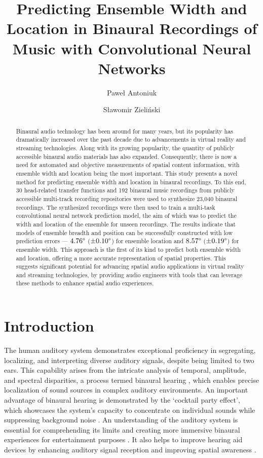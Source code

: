 \documentclass{article}
\title{Predicting Ensemble Width and Location in Binaural Recordings of Music with Convolutional Neural Networks}
\author[1,*]{Paweł Antoniuk}
\author[1]{Sławomir Zieliński}
\affil[1]{Faculty of Computer Science, Białystok University of Technology}
\affil[*]{Corresponding author: pawel.antoniuk@sd.pb.edu.pl}
\date{}
\begin{document}
\maketitle

\begin{abstract}
  Binaural audio technology has been around for many years, but its popularity has dramatically increased over the past decade due to advancements in virtual reality and streaming technologies. Along with its growing popularity, the quantity of publicly accessible binaural audio materials has also expanded. Consequently, there is now a need for automated and objective measurements of spatial content information, with ensemble width and location being the most important. This study presents a novel method for predicting ensemble width and location in binaural recordings. To this end, 30 head-related transfer functions and 192 binaural music recordings from publicly accessible multi-track recording repositories were used to synthesize 23,040 binaural recordings. The synthesized recordings were then used to train a multi-task convolutional neural network prediction model, the aim of which was to predict the width and location of the ensemble for unseen recordings. The results indicate that models of ensemble breadth and position can be successfully constructed with low prediction errors --- $4.76\degree$ ($\pm0.10\degree$) for ensemble location and $8.57\degree$ ($\pm0.19\degree$) for ensemble width. This approach is the first of its kind to predict both ensemble width and location, offering a more accurate representation of spatial properties. This suggests significant potential for advancing spatial audio applications in virtual reality and streaming technologies, by providing audio engineers with tools that can leverage these methods to enhance spatial audio experiences.
\end{abstract}

\section{Introduction}

The human auditory system demonstrates exceptional proficiency in segregating, localizing, and interpreting diverse auditory signals, despite being limited to two ears. This capability arises from the intricate analysis of temporal, amplitude, and spectral disparities, a process termed binaural hearing \cite{blauert_spatial_1996}, which enables precise localization of sound sources in complex auditory environments. An important advantage of binaural hearing is demonstrated by the `cocktail party effect', which showcases the system's capacity to concentrate on individual sounds while suppressing background noise \cite{cherry_experiments_1953}. An understanding of the auditory system is essential for comprehending its limits and creating more immersive binaural experiences for entertainment purposes \cite{zhang_surround_2017}. It also helps to improve hearing aid devices by enhancing auditory signal reception and improving spatial awareness \cite{thiemann_speech_2016}.
\end{document}
